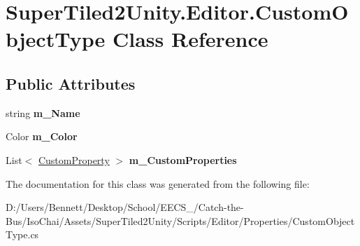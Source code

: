\hypertarget{class_super_tiled2_unity_1_1_editor_1_1_custom_object_type}{}\section{Super\+Tiled2\+Unity.\+Editor.\+Custom\+Object\+Type Class Reference}
\label{class_super_tiled2_unity_1_1_editor_1_1_custom_object_type}
\subsection*{Public Attributes}
\begin{DoxyCompactItemize}
\item 
\mbox{\label{class_super_tiled2_unity_1_1_editor_1_1_custom_object_type_ac0c2dd6a004f770c8ae486f494a41af6}} 
string {\bfseries m\+\_\+\+Name}
\item 
\mbox{\label{class_super_tiled2_unity_1_1_editor_1_1_custom_object_type_a246fb8963e9f209b2d23296623b51c4e}} 
Color {\bfseries m\+\_\+\+Color}
\item 
\mbox{\label{class_super_tiled2_unity_1_1_editor_1_1_custom_object_type_a3387db88bcf28b68574823d0654f90c7}} 
List$<$ \mbox{\hyperlink{class_super_tiled2_unity_1_1_custom_property}{Custom\+Property}} $>$ {\bfseries m\+\_\+\+Custom\+Properties}
\end{DoxyCompactItemize}


The documentation for this class was generated from the following file\+:\begin{DoxyCompactItemize}
\item 
D\+:/\+Users/\+Bennett/\+Desktop/\+School/\+E\+E\+C\+S\+\_/\+Catch-\/the-\/\+Bus/\+Iso\+Chai/\+Assets/\+Super\+Tiled2\+Unity/\+Scripts/\+Editor/\+Properties/Custom\+Object\+Type.\+cs\end{DoxyCompactItemize}
